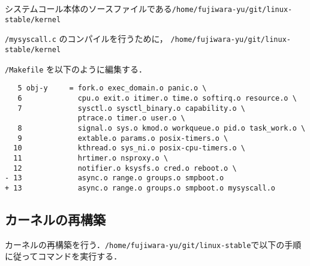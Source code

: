 \documentclass[12pt]{jsarticle}
\begin{document}
\begin{enumerate}
システムコール本体のソースファイルである\verb|/home/fujiwara-yu/git/linux-stable/kernel|

\verb|/mysyscall.c| のコンパイルを行うために，
\verb|/home/fujiwara-yu/git/linux-stable/kernel|

\verb|/Makefile| を以下のように編集する．
\begin{spacing}{0.7}
\begin{verbatim}
   5 obj-y     = fork.o exec_domain.o panic.o \
   6             cpu.o exit.o itimer.o time.o softirq.o resource.o \
   7             sysctl.o sysctl_binary.o capability.o \
                 ptrace.o timer.o user.o \
   8             signal.o sys.o kmod.o workqueue.o pid.o task_work.o \
   9             extable.o params.o posix-timers.o \
  10             kthread.o sys_ni.o posix-cpu-timers.o \
  11             hrtimer.o nsproxy.o \
  12             notifier.o ksysfs.o cred.o reboot.o \
- 13             async.o range.o groups.o smpboot.o
+ 13             async.o range.o groups.o smpboot.o mysyscall.o
\end{verbatim}
\end{spacing}

\end{enumerate}

\subsection{カーネルの再構築}\label{sec:rebuild}
カーネルの再構築を行う．\verb|/home/fujiwara-yu/git/linux-stable|で以下の手順に従ってコマンドを実行する．
\end{document}
